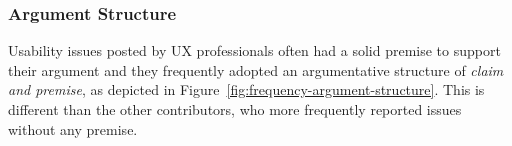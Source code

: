 \subsubsection{Argument Structure}
Usability issues posted by UX professionals often had a solid premise to support their argument and they frequently adopted an argumentative structure of \textit{claim and premise}, as depicted in Figure~\ref{fig:frequency-argument-structure}. This is different than the other contributors, who more frequently reported issues without any premise.
